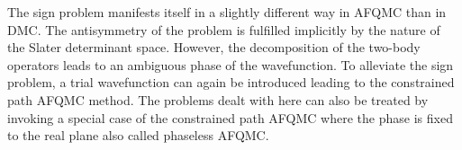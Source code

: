 The sign problem manifests itself in a slightly different way in AFQMC than in DMC.
The antisymmetry of the problem is fulfilled implicitly by the nature of the Slater determinant space.
However, the decomposition of the two-body operators leads to an ambiguous phase of the wavefunction.
To alleviate the sign problem, a trial wavefunction can again be introduced leading to the constrained path AFQMC method.\cite{Zhang1995}
The problems dealt with here can also be treated by invoking a special case of the constrained path AFQMC where the phase is fixed to the real plane also called phaseless AFQMC.\cite{Zhang2003}



